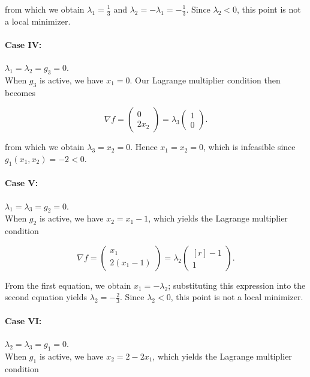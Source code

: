 \begin{solution}
    from which we obtain $\lambda_1 = \frac{1}{3}$ and $\lambda_2 = -\lambda_1 = -\frac{1}{3}$. Since $\lambda_2 < 0$, this point is not a local 
    minimizer.

    \paragraph{Case IV:} $\lambda_1 = \lambda_2 = g_3 = 0.$ \ \\
    When $g_3$ is active, we have $x_1 = 0$. Our Lagrange multiplier condition then becomes

    $$
    \nabla f = \begin{pmatrix*}
           0 \\
         2 x_2
    \end{pmatrix*} = \lambda_3 \begin{pmatrix*}
           1 \\
           0
    \end{pmatrix*}.
    $$
    
    from which we obtain $\lambda_3 = x_2 = 0$. Hence $x_1 = x_2 = 0$, which is infeasible since 
    $g_1(x_1, x_2) = -2 < 0$.

    \paragraph{Case V:} $\lambda_1 = \lambda_3 = g_2 = 0.$ \ \\
    When $g_2$ is active, we have $x_2 = x_1 - 1$, which yields the Lagrange multiplier condition

    $$
    \nabla f = \begin{pmatrix*}
           x_1 \\
         2 (x_1 - 1)
    \end{pmatrix*} = \lambda_2 \begin{pmatrix*}[r]
          -1 \\
           1
    \end{pmatrix*}.
    $$

    From the first equation, we obtain $x_1 = -\lambda_2$; substituting this expression into the second equation yields
    $\lambda_2 = -\frac{2}{3}$. Since $\lambda_2 < 0$, this point is not a local minimizer.

    \paragraph{Case VI:} $\lambda_2 = \lambda_3 = g_1 = 0.$ \ \\
    When $g_1$ is active, we have $x_2 = 2 - 2 x_1$, which yields the Lagrange multiplier condition


\end{solution}
